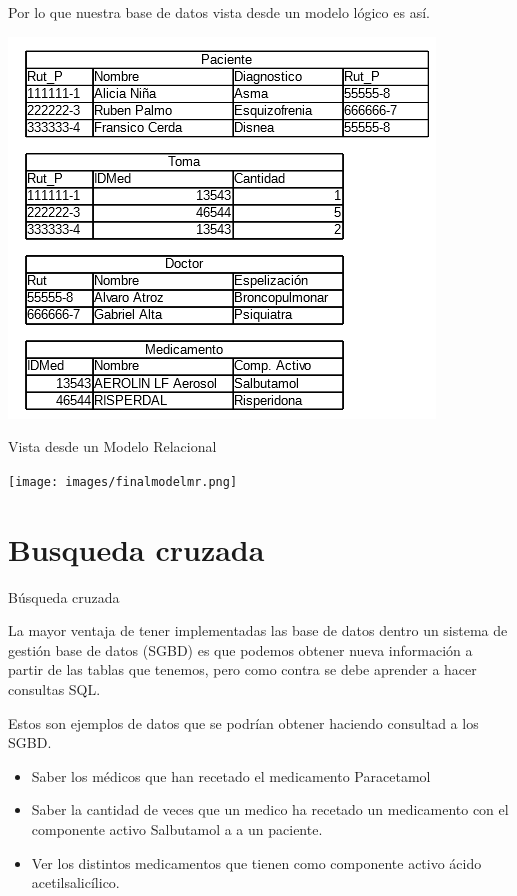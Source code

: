 \documentclass[11pt]{beamer}
\begin{document}
\begin{frame}

Por lo que nuestra base de datos vista desde un modelo lógico es así.

\begin{center}
\includegraphics[scale=.7]{images/tablafinal.png} 
\end{center}
\end{frame}

\begin{frame}{Vista desde un Modelo Relacional}

\texttt{[image: images/finalmodelmr.png]} 
\end{frame}

\section{Busqueda cruzada}


\begin{frame}{Búsqueda cruzada}

La mayor ventaja de tener implementadas las base de datos dentro un sistema de gestión base de datos (SGBD) es que podemos obtener nueva información a partir de las tablas que tenemos, pero como contra se debe aprender a hacer consultas SQL.

Estos son ejemplos de datos que se podrían obtener haciendo consultad a los SGBD.

\begin{itemize}

\item Saber los médicos que han recetado el medicamento Paracetamol

\item Saber la cantidad de veces que un medico ha recetado un medicamento con el componente activo Salbutamol a a un paciente.

\item Ver los distintos medicamentos que tienen como componente activo ácido acetilsalicílico.

\end{itemize}

\end{frame}
\end{document}
